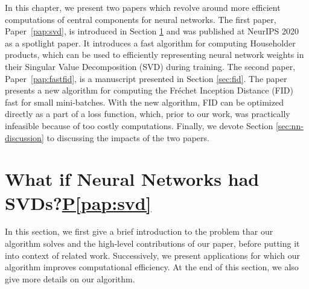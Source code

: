 \documentclass[11pt,a4paper,twoside,openright,final]{memoir}
\newcommand\contribution[1]{\hspace{0.5em}\hyperref[#1]{P\ref{#1}}}
\newcommand*{\paperref}[1]{Paper~\hyperref[#1]{\ref{#1}}}
\begin{document}
In this chapter, we present two papers which revolve around more efficient computations of central components for neural networks.
The first paper, \paperref{pap:svd}, is introduced in Section \ref{sec:svd} and was published at NeurIPS 2020 as a spotlight paper.
It introduces a fast algorithm for computing Householder products, which can be used to efficiently representing neural network weights in their Singular Value Decomposition (SVD) during training.
The second paper, \paperref{pap:fastfid}, is a manuscript presented in Section \ref{sec:fid}. 
The paper presents a new algorithm for computing the Fr\'echet Inception Distance (FID) fast for small mini-batches.
With the new algorithm, FID can be optimized directly as a part of a loss function, which, prior to our work, was practically infeasible because of too costly computations. 
Finally, we devote Section \ref{sec:nn-discussion} to discussing the impacts of the two papers. 

\section{What if Neural Networks had SVDs?\contribution{pap:svd}} \label{sec:svd}
In this section, we first give a brief introduction to the problem thar our algorithm solves and the high-level contributions of our paper, before putting it into context of related work. 
Successively, we present applications for which our algorithm improves computational efficiency.
At the end of this section, we also give more details on our algorithm.
\end{document}
